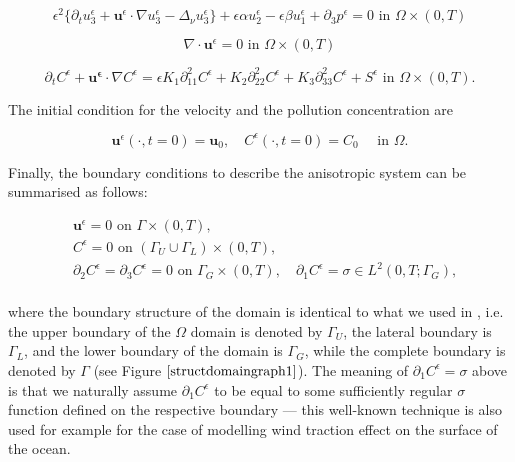 \documentclass[11pt]{article}
\begin{document}
    \begin{equation} \label{ANSC3}
    \epsilon^2 \{  \partial_t u_3^\epsilon + \mathbf{u}^\epsilon \cdot \nabla u_3^\epsilon -\Delta_\nu u_3^{\epsilon} \} + \epsilon \alpha u^\epsilon_2 - \epsilon \beta u_1^\epsilon + \partial_3 p^\epsilon = 0 \text{ in } \Omega \times (0,T)
    \end{equation}
    
    \begin{equation} \label{ANSC4}
    \nabla \cdot \mathbf{u}^\epsilon= 0 \text{ in } \Omega \times (0,T)
    \end{equation}
    
    \begin{equation} \label{ANSC5}
    \partial_t C^\epsilon + \mathbf{u^\epsilon} \cdot \nabla C^\epsilon = \epsilon K_1 \partial_{11} ^ 2 C^\epsilon + K_2 \partial_{22} ^ 2 C^\epsilon + K_3 \partial_{33} ^ 2 C^\epsilon + S^\epsilon \text{ in } \Omega \times (0,T).
    \end{equation}

The initial condition for the velocity and the pollution concentration are
    
    \begin{equation} \label{ANSC7}
    \mathbf{u}^\epsilon (\cdot, t = 0) = \mathbf{u}_0, \quad C^\epsilon (\cdot, t=0) = C_0  \quad \text{ in } \Omega.
    \end{equation}
  
  Finally, the boundary conditions to describe the anisotropic system can be summarised as follows:
  
    \begin{equation} \label{ANSC8}
      \begin{split}
        & \mathbf{u}^\epsilon = 0 \text{ on } \Gamma \times (0,T), \\
        &C^\epsilon = 0 \text{ on } ( \Gamma_U \cup \Gamma_L) \times (0,T), \\
        & \partial_2 C^\epsilon = \partial_3 C^\epsilon = 0 \text{ on } \Gamma_G \times (0,T), \quad \partial_1 C^\epsilon = \sigma \in L^2 (0,T; \Gamma_G), \\
      \end{split}
    \end{equation}
    
    where the boundary structure of the domain is identical to what we used in \cite{pollatmws2019}, i.e. the upper boundary of the $\Omega$ domain is denoted by $\Gamma_U$, the lateral boundary is $\Gamma_L$, and the lower boundary of the domain is $\Gamma_G$, while the complete boundary is denoted by $\Gamma$ (see Figure $\ref{structdomaingraph1}$). The meaning of $\partial_1 C^\epsilon = \sigma$ above is that we naturally assume $\partial_1 C^\epsilon$ to be equal to some sufficiently regular $\sigma$ function defined on the respective boundary --- this well-known technique is also used for example for the case of modelling wind traction effect on the surface of the ocean.
    
\end{document}
